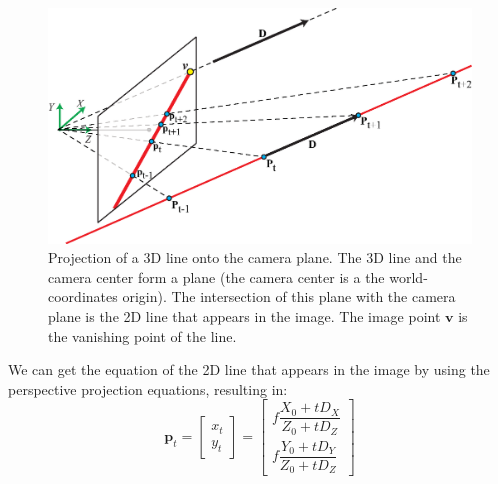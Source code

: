 \begin{figure}
\centerline{
\includegraphics[width=1\linewidth]{figures/single_view_3d/vanishing_points.eps}
}
\caption{Projection of a 3D line onto the camera plane. The 3D line and the camera center form a plane (the camera center is a the world-coordinates origin). The intersection of this plane with the camera plane is the 2D line that appears in the image. The image point $\mathbf{v}$ is the vanishing point of the line.}
\label{fig:vanishing_points}
\end{figure}



We can get the equation of the 2D line that appears in the image by using the perspective projection equations, resulting in:
\begin{equation}
\mathbf{p}_t = 
    \begin{bmatrix}
    x_t\\
    y_t
    \end{bmatrix}
    =
    \begin{bmatrix}
    f \dfrac{ X_0 + t D_X}{Z_0 + t D_Z}\\[12pt]
    f \dfrac{ Y_0 + t D_Y}{Z_0 + t D_Z}
    \end{bmatrix}
\label{eq:line_projection}
\end{equation}


